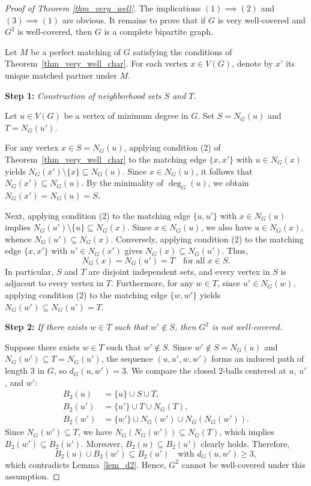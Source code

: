 \documentclass[10pt,a4paper]{amsart}
\numberwithin{equation}{section}
\theoremstyle{definition}
\begin{document}
\begin{proof}[Proof of Theorem \ref{thm_very_well}]
The implications $(1) \implies (2)$ and $(3) \implies (1)$ are obvious. It remains to prove that if $G$ is very well-covered and $G^2$ is well-covered, then $G$ is a complete bipartite graph.

Let $M$ be a perfect matching of $G$ satisfying the conditions of Theorem~\ref{thm_very_well_char}. For each vertex $x \in V(G)$, denote by $x'$ its unique matched partner under $M$. 

\smallskip
\noindent\textbf{Step 1:} \emph{Construction of neighborhood sets $S$ and $T$.}

Let $u \in V(G)$ be a vertex of minimum degree in $G$. Set $S = N_G(u)$ and $T = N_G(u')$. 

For any vertex $x \in S = N_G(u)$, applying condition (2) of Theorem~\ref{thm_very_well_char} to the matching edge $\{x, x'\}$ with $u \in N_G(x)$ yields $N_G(x') \setminus \{x\} \subseteq N_G(u)$. Since $x \in N_G(u)$, it follows that $N_G(x') \subseteq N_G(u)$. By the minimality of $\deg_G(u)$, we obtain $N_G(x') = N_G(u) = S$.

Next, applying condition (2) to the matching edge $\{u, u'\}$ with $x \in N_G(u)$ implies $N_G(u') \setminus \{u\} \subseteq N_G(x)$. Since $x \in N_G(u)$, we also have $u \in N_G(x)$, whence $N_G(u') \subseteq N_G(x)$. Conversely, applying condition (2) to the matching edge $\{x, x'\}$ with $u' \in N_G(x')$ gives $N_G(x) \subseteq N_G(u')$. Thus, 
\[
N_G(x) = N_G(u') = T \quad \text{for all } x \in S.
\]
In particular, $S$ and $T$ are disjoint independent sets, and every vertex in $S$ is adjacent to every vertex in $T$. Furthermore, for any $w \in T$, since $u' \in N_G(w)$, applying condition (2) to the matching edge $\{w, w'\}$ yields $N_G(w') \subseteq N_G(u') = T$.

\smallskip
\noindent\textbf{Step 2:} \emph{If there exists $w \in T$ such that $w' \notin S$, then $G^2$ is not well-covered.}

Suppose there exists $w \in T$ such that $w' \notin S$. Since $w' \notin S = N_G(u)$ and $N_G(w') \subseteq T = N_G(u')$, the sequence $(u, u', w, w')$ forms an induced path of length $3$ in $G$, so $d_G(u, w') = 3$. We compare the closed $2$-balls centered at $u$, $u'$, and $w'$:
\begin{align*}
    B_2(u) &= \{u\} \cup S \cup T, \\
    B_2(u') &= \{u'\} \cup T \cup N_G(T), \\
    B_2(w') &= \{w'\} \cup N_G(w') \cup N_G(N_G(w')).
\end{align*}
Since $N_G(w') \subseteq T$, we have $N_G(N_G(w')) \subseteq N_G(T)$, which implies $B_2(w') \subseteq B_2(u')$. Moreover, $B_2(u) \subseteq B_2(u')$ clearly holds. Therefore,
\[
B_2(u) \cup B_2(w') \subseteq B_2(u') \quad \text{with } d_G(u, w') \ge 3,
\]
which contradicts Lemma~\ref{lem_d2}. Hence, $G^2$ cannot be well-covered under this assumption.


\end{proof}
\end{document}
